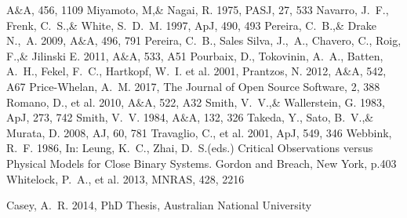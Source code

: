 \documentclass[a4paper,fleqn,usenatbib]{mnras}
\begin{document}
\begin{thebibliography}{99}
A$\&$A, 456, 1109
Miyamoto, M,\& Nagai, R. 1975, 
PASJ, 27, 533
Navarro, J.~F., Frenk, C.~S.,\& White, S.~D.~M. 1997, 
ApJ, 490, 493
Pereira, C.~B.,\& Drake N.,~A. 2009, 
A$\&$A, 496, 791
Pereira, C.~B., Sales Silva, J.,~A., Chavero, C., Roig, F.,\& Jilinski E. 2011, 
A$\&$A, 533, A51
Pourbaix, D., Tokovinin, A.~A., Batten, A.~H., Fekel, F.~C., Hartkopf, W.~I. et al. 2001, 
Prantzos, N. 2012, 
A$\&$A, 542, A67
Price-Whelan, A.~M. 2017, 
The Journal of Open Source Software, 2, 388
Romano, D., et al. 2010, 
A$\&$A, 522, A32
Smith, V.~V.,\& Wallerstein, G. 1983, 
ApJ, 273, 742
Smith, V.~V. 1984, 
A$\&$A, 132, 326
Takeda, Y., Sato, B.~V.,\& Murata, D. 2008, 
AJ, 60, 781
Travaglio, C., et al. 2001, 
ApJ, 549, 346
Webbink, R.~F. 1986, 
In: Leung, K.~C., Zhai, D.~S.(eds.) Critical Observations versus Physical Models for Close Binary Systems. Gordon and Breach, New York, p.403
Whitelock, P.~A., et al. 2013, 
MNRAS, 428, 2216

Casey, A.~R. 2014, 
PhD Thesis, Australian National University

\end{thebibliography}


\bsp	%
\label{lastpage}
\end{document}
